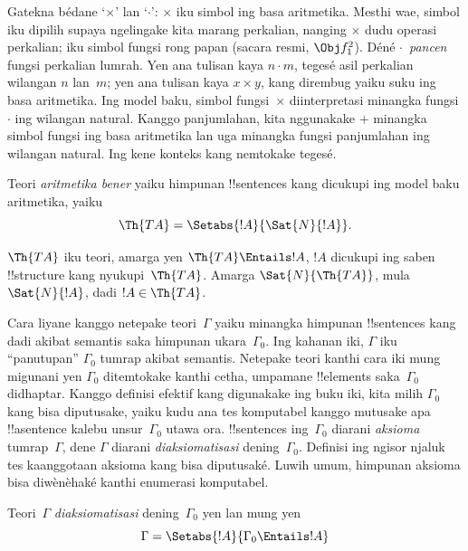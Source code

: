 \documentclass[../../../include/open-logic-section]{subfiles}
\begin{document}
Gatekna bédane `$\times$' lan `$\cdot$':
$\times$ iku simbol ing basa aritmetika.
Mesthi wae, simbol iku dipilih supaya
ngelingake kita marang perkalian, nanging
$\times$ dudu operasi perkalian; iku simbol
fungsi rong papan (sacara resmi, $\Obj f^2_1$).
Déné $\cdot$~\emph{pancen} fungsi perkalian lumrah.
Yen ana tulisan kaya $n \cdot m$, tegesé asil
perkalian wilangan $n$ lan~$m$; yen ana tulisan
kaya $x \times y$, kang dirembug yaiku suku
ing basa aritmetika. Ing model baku, simbol
fungsi~$\times$ diinterpretasi minangka fungsi
$\cdot$ ing wilangan natural. Kanggo panjumlahan,
kita nggunakake $+$ minangka simbol fungsi
ing basa aritmetika lan uga minangka fungsi
panjumlahan ing wilangan natural. Ing kene konteks
kang nemtokake tegesé.

\begin{defn}
Teori \emph{aritmetika bener} yaiku himpunan
!!{sentence}s kang dicukupi ing model baku
aritmetika, yaiku
\[
\Th{TA} = \Setabs{!A}{\Sat{N}{!A}}.
\]
\end{defn}

$\Th{TA}$ iku teori, amarga yen
$\Th{TA} \Entails !A$, $!A$ dicukupi ing
saben !!{structure} kang nyukupi~$\Th{TA}$.
Amarga $\Sat{N}{\Th{TA}}$, mula
$\Sat{N}{!A}$, dadi $!A \in \Th{TA}$.

Cara liyane kanggo netepake teori~$\Gamma$
yaiku minangka himpunan !!{sentence}s kang
dadi akibat semantis saka himpunan ukara~$\Gamma_0$.
Ing kahanan iki, $\Gamma$ iku ``panutupan''
$\Gamma_0$ tumrap akibat semantis. Netepake
teori kanthi cara iki mung migunani yen
$\Gamma_0$ ditemtokake kanthi cetha, umpamane
!!{element}s saka~$\Gamma_0$ didhaptar.
Kanggo definisi efektif kang digunakake ing buku iki,
kita milih $\Gamma_0$ kang bisa diputusake,
yaiku kudu ana tes komputabel kanggo mutusake
apa !!a{sentence} kalebu unsur~$\Gamma_0$
utawa ora. !!{sentence}s ing~$\Gamma_0$
diarani \emph{aksioma} tumrap~$\Gamma$,
dene $\Gamma$ diarani \emph{diaksiomatisasi}
dening~$\Gamma_0$. Definisi ing ngisor njaluk tes kaanggotaan aksioma kang bisa diputusaké. Luwih umum, himpunan aksioma bisa diwènèhaké kanthi enumerasi komputabel.

\begin{defn}
Teori~$\Gamma$ \emph{diaksiomatisasi}
dening~$\Gamma_0$ yen lan mung yen
\[
\Gamma = \Setabs{!A}{\Gamma_0 \Entails !A}
\]
\end{defn}
\end{document}
